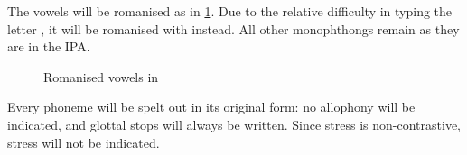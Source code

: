 The vowels will be romanised as in \cref{fig:vowels_romanised}. Due to the relative
difficulty in typing the letter , it will be romanised with  instead.
All other monophthongs remain as they are in the IPA.
\begin{figure}[htbp]
  \centering
  \begin{vowel}
  \end{vowel}
  \caption{Romanised vowels in \langname{}}
  \label{fig:vowels_romanised}
\end{figure}

Every phoneme will be spelt out in its original form: no allophony will be indicated, and glottal stops
will always be written. Since stress is non-contrastive, stress will not be indicated.
